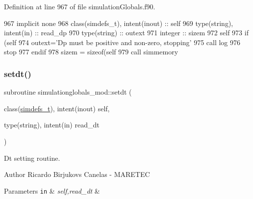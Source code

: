 Definition at line 967 of file simulation\+Globals.\+f90.


\begin{DoxyCode}
967     \textcolor{keywordtype}{implicit none}
968     \textcolor{keywordtype}{class}(simdefs\_t), \textcolor{keywordtype}{intent(inout)} :: self
969     \textcolor{keywordtype}{type}(string), \textcolor{keywordtype}{intent(in)} :: read\_dp
970     \textcolor{keywordtype}{type}(string) :: outext
971     \textcolor{keywordtype}{integer} :: sizem
972     self%
973     \textcolor{keywordflow}{if} (self%
974         outext=\textcolor{stringliteral}{'Dp must be positive and non-zero, stopping'}
975         \textcolor{keyword}{call }log%
976         stop
977 \textcolor{keywordflow}{    endif}
978     sizem = sizeof(self%
979     \textcolor{keyword}{call }simmemory%
\end{DoxyCode}
\mbox{\label{namespacesimulationglobals__mod_a0eced3f4367d08f3d0cb6ef2044bdc56}} 
\subsubsection{\texorpdfstring{setdt()}{setdt()}}
{\footnotesize\ttfamily subroutine simulationglobals\+\_\+mod\+::setdt (\begin{DoxyParamCaption}\item[{class(\mbox{\hyperlink{structsimulationglobals__mod_1_1simdefs__t}{simdefs\+\_\+t}}), intent(inout)}]{self,  }\item[{type(string), intent(in)}]{read\+\_\+dt }\end{DoxyParamCaption})\hspace{0.3cm}{\ttfamily [private]}}



Dt setting routine. 

\begin{DoxyAuthor}{Author}
Ricardo Birjukovs Canelas -\/ M\+A\+R\+E\+T\+EC 
\end{DoxyAuthor}

\begin{DoxyParams}[1]{Parameters}
\mbox{\tt in}  & {\em self,read\+\_\+dt} & \\
\hline
\end{DoxyParams}



